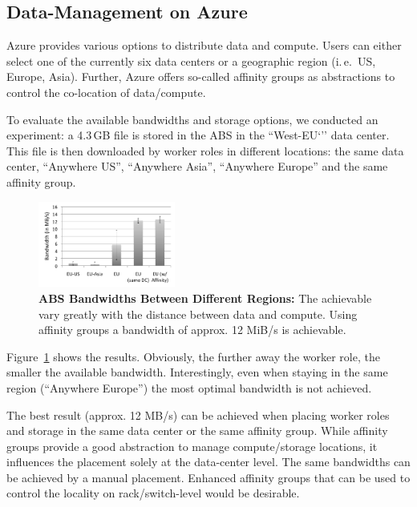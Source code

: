 \documentclass[conference,final]{IEEEtran}
\newcommand{\up}{\vspace*{-1em}}
\newcommand{\alnote}[1]{ {\textcolor{blue} { ***AL: #1 }}}
\newcommand{\jhanote}[1]{ {\textcolor{red} { ***SJ: #1 }}}
\newcommand{\alnote}[1]{}
\newcommand{\jhanote}[1]{}
\begin{document}
\subsection{Data-Management on Azure}
\up Azure provides various options to distribute data and
compute. Users can either select one of the currently six data centers
or a geographic region (i.\,e.\ US, Europe, Asia). Further, Azure
offers so-called affinity groups as abstractions to control the
co-location of data/compute.

To evaluate the available bandwidths and storage options, we conducted
an experiment: a 4.3\,GB file is stored in the ABS in 
the ``West-EU`'' data center. This file is then
downloaded by worker roles in different locations: the same data center,
``Anywhere US'', ``Anywhere Asia'', ``Anywhere Europe'' and 
the same affinity group.


\begin{figure}[t]
    \centering
        \includegraphics[width=0.4\textwidth]{performance/azure-data-transfer.pdf}
          \caption{\textbf{ABS Bandwidths Between
            Different Regions:} The achievable vary greatly with the
          distance between data and compute. Using affinity groups a
          bandwidth of approx. 12 MiB/s is achievable.}
    \label{fig:performance_azure-data-transfer}
    \up\up
\end{figure}
Figure~\ref{fig:performance_azure-data-transfer} shows the results.
Obviously, the further away the worker role, the smaller the available
bandwidth. Interestingly, even when staying in the same region
(``Anywhere Europe'') the most optimal bandwidth is not achieved.

The best result (approx. 12 MB/s) %
can be achieved when placing worker roles and storage in the same data
center or the same affinity group. While affinity groups provide a
good abstraction to manage compute/storage locations, it influences
the placement solely at the data-center level. The same bandwidths can
be achieved by a manual placement. Enhanced affinity groups that can
be used to control the locality on rack/switch-level would be
desirable.
\end{document}
